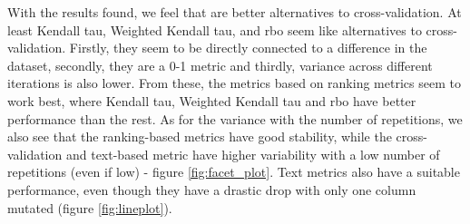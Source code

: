 With the results found, we feel that are better alternatives to cross-validation. At least  Kendall tau, Weighted Kendall tau, and \ac{rbo} seem like alternatives to cross-validation.
Firstly, they seem to be directly connected to a difference in the dataset, secondly, they are a 0-1 metric and thirdly, variance across different iterations is also lower.
From these, the metrics based on ranking metrics seem to work best, where Kendall tau, Weighted Kendall tau and \ac{rbo} have better performance than the rest. As for the variance with the number of repetitions, we also see that the ranking-based metrics have good stability, while the cross-validation and text-based metric have higher variability with a low number of repetitions (even if low) - figure \ref{fig:facet_plot}. 
Text metrics also have a suitable performance, even though they have a drastic drop with only one column mutated (figure \ref{fig:lineplot}).

